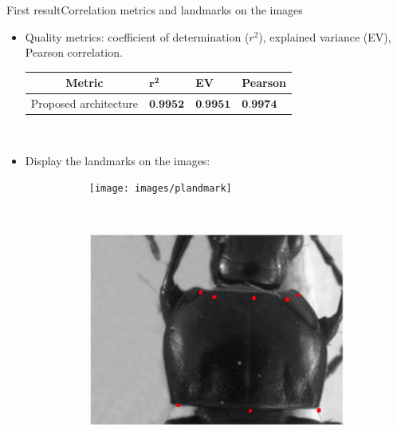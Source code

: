 \documentclass[10pt,svgnames]{beamer}
\begin{document}
\begin{frame}{First result}{Correlation metrics and landmarks on the images}
	\begin{itemize}
		\item Quality metrics: coefficient of determination ($r^2$), explained variance (EV), Pearson correlation.
			\begin{table}[htbp]
				\centering
				\begin{tabular}{|c|p{1cm}|p{1cm}|p{1.5cm}|}
					\hline
					Metric & $\mathbf{r^{2}}$ & \textbf{EV} & \textbf{Pearson} \\ \hline
					Proposed architecture & $\textbf{0.9952}$ & $\textbf{0.9951}$ & $\textbf{0.9974}$ \\ \hline
				\end{tabular}
			\end{table}~\\
	\pause
	\item Display the landmarks on the images:
	\begin{figure}[htbp]
   				\begin{subfigure}[t]{0.5\textwidth}
        			\centering
        			\texttt{[image: images/plandmark]}
        			\caption{ }
        			\label{figsub11}
    			\end{subfigure}%
    			~ 
    			\begin{subfigure}[t]{0.5\textwidth}
        			\centering
        			\includegraphics[scale=.2]{images/plandmark2}
        			\caption{ }
        			\label{figsub22}
    			\end{subfigure} 
    		\end{figure}
   	\end{itemize}
\end{frame}
\end{document}
